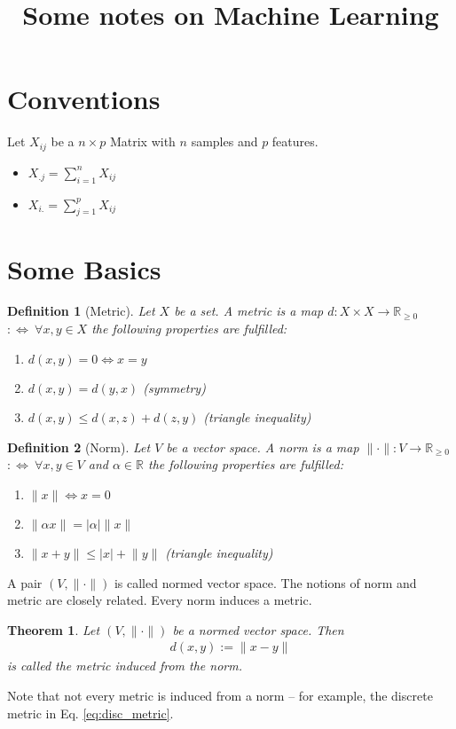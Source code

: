 \documentclass[10pt,a4paper]{article}
\title{Some notes on Machine Learning}
\newtheorem{theorem}{Theorem}
\newtheorem{definition}{Definition}
\begin{document}
\maketitle
\section{Conventions}
Let $X_{ij}$ be a $n\times p$ Matrix with $n$ samples and $p$ features.
\begin{itemize}
\item $X_{.j}=\sum_{i=1}^{n} X_{ij}$
\item $X_{i.}=\sum_{j=1}^{p} X_{ij}$
\end{itemize}

\section{Some Basics}
\begin{definition}[Metric] Let $X$ be a set. A metric is a map $d: X \times X \rightarrow \mathbb R_{\geq 0}$   $:\Leftrightarrow~\forall x,y \in X$ the following properties are fulfilled:
\begin{enumerate}
\item $d(x,y) = 0 \Leftrightarrow x=y$ 
\item $d(x,y)=d(y,x)$ (symmetry)
\item $d(x,y)\leq d(x,z)+d(z,y)$ (triangle inequality)
\end{enumerate}
\end{definition}

\begin{definition}[Norm] \label{def:norm}
Let $V$ be a vector space. A  norm is a map $\lVert\cdot \rVert: V \rightarrow \mathbb R_{\geq 0}$   $:\Leftrightarrow~\forall x,y \in V$ and $\alpha \in \mathbb R$ the following properties are fulfilled:
\begin{enumerate}
\item $\lVert x \rVert \Leftrightarrow x=0$
\item $\lVert \alpha x \rVert = \lvert \alpha \rvert \lVert x \rVert $
\item $\lVert  x + y \rVert \leq \lvert x \rvert + \lVert y \rVert $ (triangle inequality)
\end{enumerate}
\end{definition}
A pair $(V, \lVert \cdot \rVert)$ is called normed vector space.
The notions of  norm and  metric are closely related. Every norm induces a metric.
\begin{theorem} Let $(V, \lVert \cdot \rVert)$ be a normed vector space. Then  
\begin{align} 
 d(x,y) := \lVert x-y \rVert 	
\end{align}
is called the metric induced from the norm.
\end{theorem}
Note that not every metric is induced from a norm -- for example, the discrete metric in Eq. \ref{eq:disc_metric}. 
\end{document}
